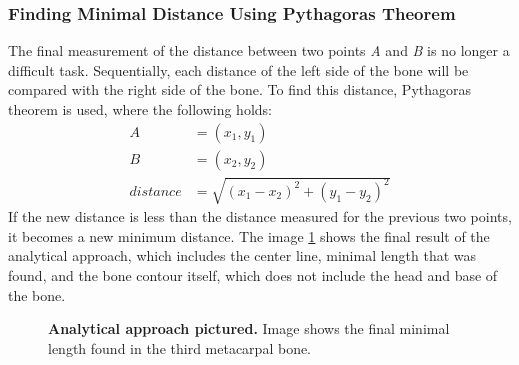 \subsubsection*{Finding Minimal Distance Using Pythagoras Theorem}
The final measurement of the distance between two points \textit{A} and \textit{B} is no longer a difficult task. Sequentially, each distance of the left side of the bone will be compared with the right side of the bone. To find this distance, Pythagoras theorem is used, where the following holds:
\begin{equation}
\begin{split}
A &= (x_1,y_1)\\
B &= (x_2,y_2)\\
distance &=\sqrt{(x_1 - x_2)^2 + (y_1 - y_2)^2}
\end{split}
\end{equation}
If the new distance is less than the distance measured for the previous two points, it becomes a new minimum distance. The image \ref{center-line-width} shows the final result of the analytical approach, which includes the center line, minimal length that was found, and the bone contour itself, which does not include the head and base of the bone.

\begin{figure}[!ht]
    \centering
    \caption{\textbf{Analytical approach pictured.} Image shows the final minimal length found in the third metacarpal bone.}
    \label{center-line-width}
\end{figure}

